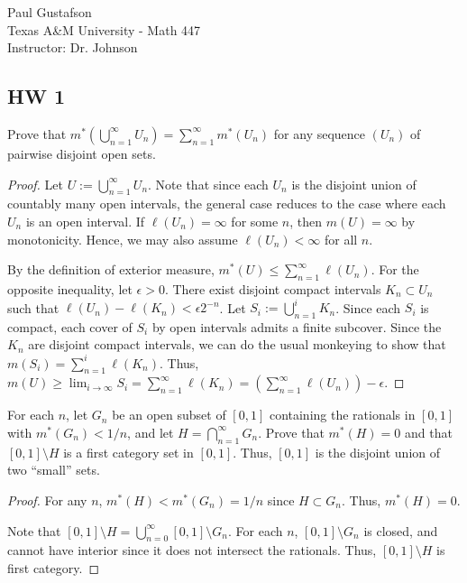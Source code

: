 
\noindent Paul Gustafson\\
\noindent Texas A\&M University - Math 447\\
\noindent Instructor: Dr. Johnson

\subsection*{HW 1}
 Prove that $m^*(\bigcup_{n=1}^\infty U_n) = \sum_{n=1}^\infty m^*(U_n)$ for any sequence $(U_n)$ of pairwise disjoint open sets.
\begin{proof}
Let $U := \bigcup_{n=1}^\infty U_n$. Note that since each $U_n$ is the disjoint union of countably many open intervals, the general case reduces to the case where each $U_n$ is an open interval. 
If $\ell(U_n) = \infty$ for some $n$, then $m(U) = \infty$ by monotonicity. Hence, we may also assume $\ell(U_n) < \infty$ for all $n$. 

By the definition of exterior measure, $m^*(U) \leq \sum_{n=1}^\infty \ell(U_n)$. For the opposite inequality, let $\epsilon > 0$.  There exist disjoint compact intervals $K_n \subset U_n$ such that $\ell(U_n) - \ell(K_n) < \epsilon 2^{-n}$. Let $S_i := \bigcup_{n=1}^i K_n$.  Since each $S_i$ is compact, each cover of $S_i$ by open intervals admits a finite subcover.  Since the $K_n$ are disjoint compact intervals, we can do the usual monkeying to show that $m(S_i) = \sum_{n=1}^i \ell(K_n)$.  Thus, $m(U) \geq \lim_{i\rightarrow \infty} S_i = \sum_{n=1}^\infty \ell(K_n) = (\sum_{n=1}^\infty \ell(U_n)) - \epsilon$.
\end{proof}



 For each $n$, let $G_n$ be an open subset of $[0,1]$ containing the rationals in $[0,1]$ with $m^*(G_n) < 1/n$, and let $H = \bigcap_{n=1}^\infty G_n$. Prove that $m^*(H) = 0$ and that $[0,1]\setminus H $ is a first category set in $[0,1]$. Thus, $[0,1]$ is the disjoint union of two ``small'' sets.
\begin{proof}
For any $n$, $m^*(H) < m^*(G_n) = 1/n$ since $H \subset G_n$. Thus, $m^*(H) = 0$. 

Note that $[0,1]\setminus H = \bigcup_{n=0}^\infty [0,1]\setminus G_n$. For each $n$, $[0,1]\setminus G_n$ is closed, and cannot have interior since it does not intersect the rationals. Thus, $[0,1]\setminus H$ is first category.
\end{proof}



